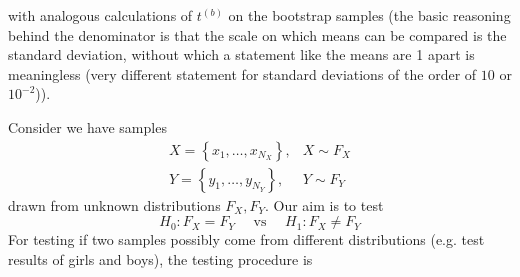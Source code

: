 with analogous calculations of $t^{(b)}$ on the bootstrap samples (the basic reasoning behind the denominator is that the scale on which means can be compared
is the standard deviation, without which a statement like the means are 1 apart is meaningless (very different statement for standard deviations
of the order of $10$ or $10^{-2}$)).


Consider we have samples
\begin{equation}
    \begin{array}{ll}
    X=\left\{x_1, \ldots, x_{N_X}\right\}, & X \sim F_X \\
    Y=\left\{y_1, \ldots, y_{N_Y}\right\}, & Y \sim F_Y
    \end{array}
\end{equation}
drawn from unknown distributions $F_X,F_Y$. Our aim is to test
\begin{equation}
    H_0: F_X = F_Y \quad \text { vs } \quad H_1: F_X \neq F_Y
\end{equation}
For testing if two samples possibly come from different distributions
(e.g. test results of girls and boys), the testing procedure is
